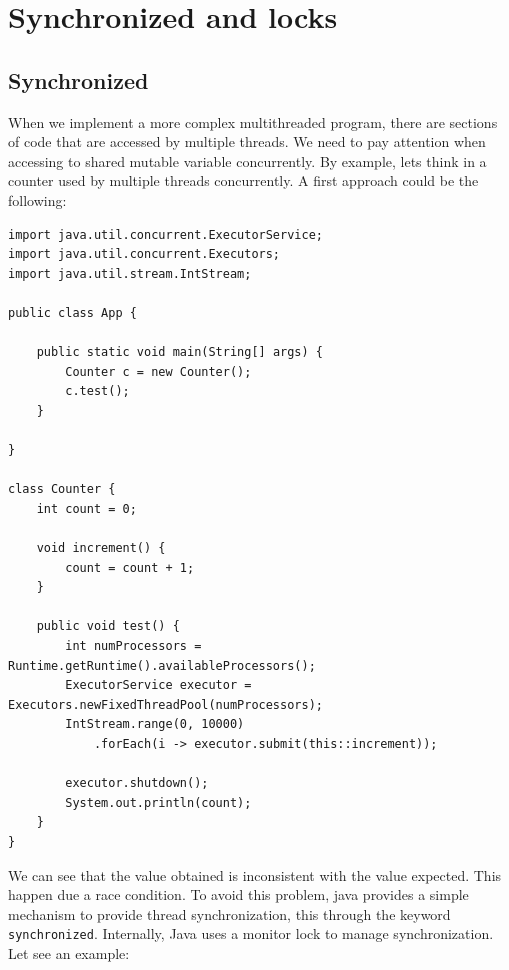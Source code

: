 \documentclass[openany, a4paper]{book}
\theoremstyle{break}
\theoremstyle{example}
\theoremstyle{note}
\theoremstyle{break}
\theoremstyle{exercise}
\begin{document}
\section{Synchronized and locks}
\label{sec:org336a159}


\subsection{Synchronized}
\label{sec:org9002419}

When we implement a more complex multithreaded program, there are sections
of code that are accessed by multiple threads. We need to pay attention when
accessing to shared mutable variable concurrently. By example, lets think in
a counter used by multiple threads concurrently. A first approach could be
the following:

\begin{verbatim}
import java.util.concurrent.ExecutorService;
import java.util.concurrent.Executors;
import java.util.stream.IntStream;

public class App {

    public static void main(String[] args) {
        Counter c = new Counter();
        c.test();
    }

}

class Counter {
    int count = 0;

    void increment() {
        count = count + 1;
    }

    public void test() {
        int numProcessors = Runtime.getRuntime().availableProcessors();
        ExecutorService executor = Executors.newFixedThreadPool(numProcessors);
        IntStream.range(0, 10000)
            .forEach(i -> executor.submit(this::increment));

        executor.shutdown();
        System.out.println(count);
    }
}
\end{verbatim}

We can see that the value obtained is inconsistent with the value
expected. This happen due a race condition.  To avoid this problem, java
provides a simple mechanism to provide thread synchronization, this through
the keyword \texttt{synchronized}. Internally, Java uses a monitor lock to manage
synchronization. Let see an example:
\end{document}
